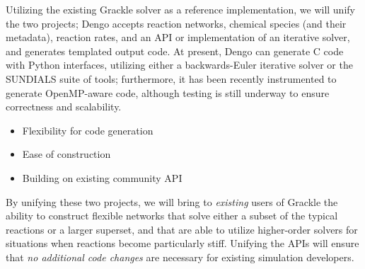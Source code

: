 Utilizing the existing Grackle
solver as a reference implementation, we will unify the two projects; Dengo
accepts reaction networks, chemical species (and their metadata), reaction
rates, and an API or implementation of an iterative solver, and generates
templated output code.  At present, Dengo can generate C code with Python
interfaces, utilizing either a backwards-Euler iterative solver or the SUNDIALS
suite of tools; furthermore, it has been recently instrumented to generate
OpenMP-aware code, although testing is still underway to ensure correctness and
scalability.

\begin{itemize}
\item Flexibility for code generation
\item Ease of construction
\item Building on existing community API
\end{itemize}

By unifying these two projects, we will bring to \textit{existing} users of
Grackle the ability to construct flexible networks that solve either a subset
of the typical reactions or a larger superset, and that are able to utilize
higher-order solvers for situations when reactions become particularly stiff.
Unifying the APIs will ensure that \textit{no additional code changes} are
necessary for existing simulation developers.
